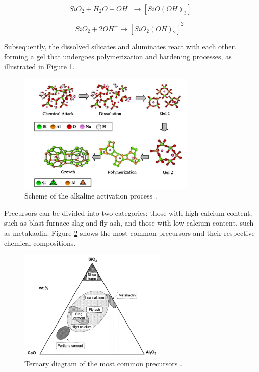\begin{equation}
  SiO_2 + H_2O + OH^- \rightarrow \left[SiO(OH)_3\right]^- 
\end{equation}

\begin{equation}
  SiO_2 + 2OH^- \rightarrow \left[SiO_2(OH)_2\right]^{2-}
\end{equation}

Subsequently, the dissolved silicates and aluminates react with each other, forming a gel that undergoes polymerization and hardening processes, as illustrated in Figure \ref{fig:activation}.

\begin{figure}[ht]
  \centering
  \includegraphics[width=0.75\textwidth]{Cap2/activation.png}
  \caption{Scheme of the alkaline activation process \cite{duxson2006geopolymer}.}
  \label{fig:activation}
\end{figure}

Precursors can be divided into two categories: those with high calcium content, such as blast furnace slag and fly ash, and those with low calcium content, such as metakaolin.
Figure \ref{fig:ternary_diagram} shows the most common precursors and their respective chemical compositions.

\begin{figure}[ht]
  \centering
  \includegraphics[width=0.625\textwidth]{Cap2/ternary_diagram.png}
  \caption{Ternary diagram of the most common precursors \cite{giergiczny2019fly}.}
  \label{fig:ternary_diagram}
\end{figure}

